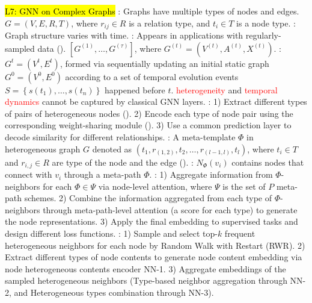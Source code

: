 %
%
\hl{L7: GNN on Complex Graphs}
: Graphs have multiple types of nodes and edges. $G=(V,E,R,T)$, where $r_{ij} \in R$ is a relation type, and $t_i \in T$ is a node type.
: Graph structure varies with time.
: Appears in applications with regularly-
sampled data (\eg {}). $[G^{(1)},\dots,G^{(\tau)}]$, where $G^{(t)}=(V^{(t)}, A^{(t)}, X^{(t)})$.
: $G^t = (V^t, E^t)$, formed via sequentially updating an initial static graph $G^0 = (V^0, E^0)$ according to a set of temporal evolution events $S=\left\{s(t_1),\dots,s(t_n)\right\}$ happened before $t$.
\textcolor{red}{heterogeneity} and \textcolor{red}{temporal dynamics} cannot be captured by classical GNN layers.
: 1) Extract different types of pairs of heterogeneous nodes (\eg {}). 2) Encode each type of node pair using the corresponding weight-sharing module (\eg {}). 3) Use a common prediction layer to decode similarity for different relationships.
: A meta-template $\Phi$ in heterogeneous graph $G$ denoted as $(t_1,r_{(1,2)},t_2,\dots,r_{(l-1,l)},t_l)$, where $t_i \in T$ and $r_{i,j} \in R$ are type of the node and the edge (\eg {}).
: $N_\Phi(v_i)$ contains nodes that connect with $v_i$ through a meta-path $\Phi$.
:
1) Aggregate information from $\Phi$-neighbors for each $\Phi \in \Psi$ via node-level attention, where $\Psi$ is the set of $P$ meta-path schemes.
2) Combine the information aggregated from each type of $\Phi$-neighbors through meta-path-level attention (a score for each type) to generate the node representations.
3) Apply the final embedding to supervised tasks and design different loss functions.
:
1) Sample and select top-$k$ frequent heterogeneous neighbors for each node by Random Walk with Restart (RWR).
2) Extract different types of node contents to generate node content embedding via node heterogeneous contents encoder NN-1.
3) Aggregate embeddings of the sampled heterogeneous neighbors (\ie Type-based neighbor aggregation through NN-2, and Heterogeneous types combination through NN-3).
